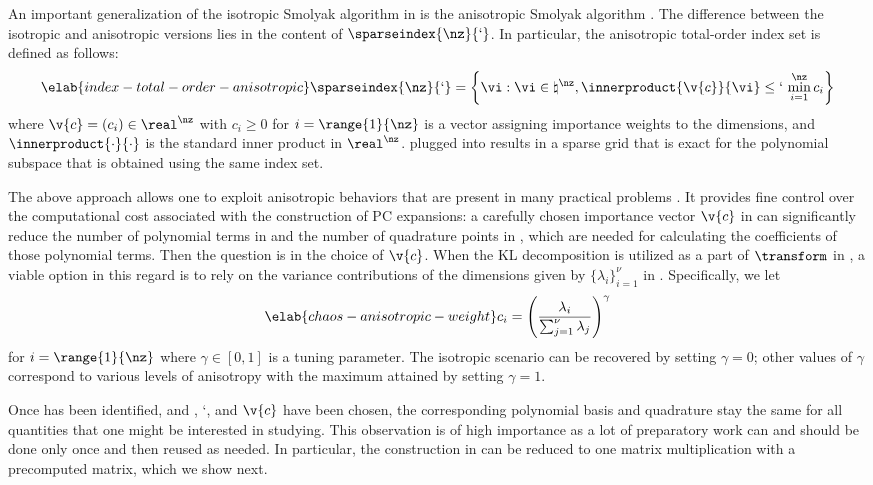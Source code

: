 An important generalization of the isotropic Smolyak algorithm in
 is the anisotropic Smolyak algorithm \cite{nobile2008}.
The difference between the isotropic and anisotropic versions lies in the
content of $\sparseindex{\nz}{\lq}$. In particular, the anisotropic total-order
index set is defined as follows:
\begin{equation} \elab{index-total-order-anisotropic}
  \sparseindex{\nz}{\lq} = \left\{ \vi: \vi \in \natural^\nz, \innerproduct{\v{c}}{\vi} \leq \lq \, \min_{i = 1}^\nz c_i \right\}
\end{equation}
where $\v{c} = (c_i) \in \real^\nz$ with $c_i \geq 0$ for $i = \range{1}{\nz}$
is a vector assigning importance weights to the dimensions, and
$\innerproduct{\cdot}{\cdot}$ is the standard inner product in $\real^\nz$.
 plugged into 
results in a sparse grid that is exact for the polynomial subspace that is
obtained using the same index set.

The above approach allows one to exploit anisotropic behaviors that are present
in many practical problems \cite{nobile2008}. It provides fine control over the
computational cost associated with the construction of \ac{PC} expansions: a
carefully chosen importance vector $\v{c}$ in
 can significantly reduce the number of
polynomial terms in  and the number of quadrature points
in , which are needed for calculating the coefficients
of those polynomial terms. Then the question is in the choice of $\v{c}$. When
the \ac{KL} decomposition is utilized as a part of $\transform$ in
, a viable option in this regard is to rely on the
variance contributions of the dimensions given by $\{ \lambda_i \}_{i = 1}^\nu$
in . Specifically, we let
\begin{equation} \elab{chaos-anisotropic-weight}
  c_i = \left(\frac{\lambda_i}{\sum_{j = 1}^\nu \lambda_j}\right)^\gamma
\end{equation}
for $i = \range{1}{\nz}$ where $\gamma \in [0, 1]$ is a tuning parameter. The
isotropic scenario can be recovered by setting $\gamma = 0$; other values of
$\gamma$ correspond to various levels of anisotropy with the maximum attained by
setting $\gamma = 1$.

Once \vz has been identified, and \lc, \lq, and $\v{c}$ have been chosen, the
corresponding polynomial basis and quadrature stay the same for all quantities
that one might be interested in studying. This observation is of high importance
as a lot of preparatory work can and should be done only once and then reused as
needed. In particular, the construction in  can be reduced
to one matrix multiplication with a precomputed matrix, which we show next.

